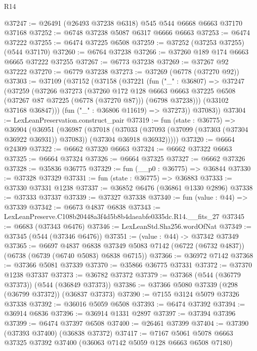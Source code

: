 \begin{lexlean}{R14}
\begin{coremodule}
@37247 := @26491 (@26493 @37238 @6318) @545 @544 @6668 @6663 @37170 @37168
@37252 := @6748 @37238 @5087 @6317 @6666 @6663
@37253 := @6474 @37222
@37255 := @6474 @37225 @6508
@37259 := @37252 (@37253 @37255) (@544 @37170)
@37260 := @6764 @37238
@37266 := @37260 @189 @174 @6663 @6665 @37222 @37255
@37267 := @6773 @37238
@37269 := @37267 @92 @37222
@37270 := @6779 @37238
@37273 := @37269 (@6778 (@37270 @92))
@37303 := @37109
    (@37152
      (@37158
        (@37221
          (fun ("_" : @36807) =>
          @37247
            (@37259
              (@37266
                @37273
                (@37260
                  @172
                  @128
                  @6663
                  @6663
                  @37225
                  @6508
                  (@37267 @87 @37225 (@6778 (@37270 @87)))
                  (@6798 @37238)))
              (@33102 @37168 @36847)))
          (fun ("_" : @36806 @11619) => @37273))
        @37083))
@37304 := LexLeanPreservation.construct_pair
@37319 := fun (state : @36775) =>
  @36904
    (@36951
      (@36987
        (@37018
          (@37033
            (@37093 (@37099 (@37303 (@37304 @36922 @36931)) @37083))
            (@37304 @36918 @36932)))))
@37320 := @6664 @24309
@37322 := @6662 @37320 @6663
@37324 := @6662 @37322 @6663
@37325 := @6664 @37324
@37326 := @6664 @37325
@37327 := @6662 @37326
@37328 := @35836 @36775
@37329 := fun (__p0 : @36775) => @36844
@37330 := @37328 @37329
@37331 := fun (state : @36775) => @36883
@37333 := @37330 @37331 @1238
@37337 := @36852 @6476 (@36861 @1330 @2896)
@37338 := @37333 @37337
@37339 := @37327 @37338
@37340 := fun (value : @44) => @37339
@37342 := @6673 @4837 @6838
@37343 := LexLeanPreserve.C108b20448a3f4d5b8b4daeabfe0335dc.R14.__fits_27
@37345 := @6683 (@37343 @6476)
@37346 := LexLeanStd.Sha256.wordOfNat
@37349 := @37345 (@544 (@37346 @6476))
@37351 := (value : @44) -> @37342 @37349
@37365 := @6697
    @4837
    @6838
    @37349
    @5083
    @7142
    (@6722 (@6732 @4837))
    (@6738 (@6739 (@6740 @5083) @6838 @6715))
@37366 := @36972 @7142
@37368 := @37366 @5081 @37339
@37370 := @35866 @36775 @37331
@37372 := @37370 @1238 @37337
@37373 := @36782 @37372
@37379 := @37368 (@544 (@36779 @37373)) (@544 (@36849 @37373))
@37386 := @37366 @5080 @37339 (@298 (@36799 @37372)) (@36837 @37373)
@37390 := @7155 @3124 @5079 @37326 @37338
@37392 := @36016 @5059 @6508
@37393 := @6474 @37392
@37394 := @36914 @6836
@37396 := @36914 @1331 @2897
@37397 := @37394 @37396
@37399 := @6474 @37397 @6508
@37400 := @26461 @37399
@37404 := @37390 (@37393 @37400) (@36838 @37372)
@37417 := @7167 @5061 @5078 @6663 @37325 @37392 @37400 (@36063 @7142 @5059 @128 @6663 @6508 @7180)

\end{coremodule}
\end{lexlean}

